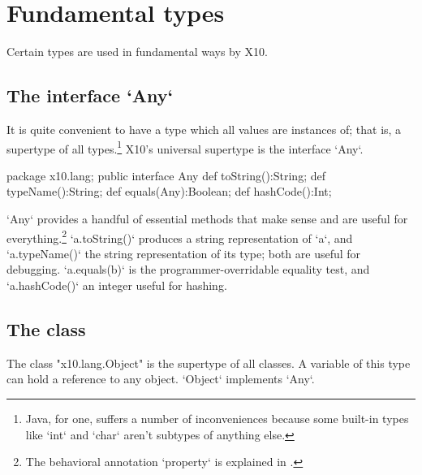 {\begin{itemize}
\end{itemize}


\section{Fundamental types}

Certain types are used in fundamental ways by X10.  

\subsection{The interface \xcd`Any`}

It is quite convenient to have a type which all values are instances of; that
is, a supertype of all types.\footnote{Java, for one, suffers a number of
  inconveniences because some built-in types like \xcd`int` and \xcd`char`
  aren't subtypes of anything else.}  X10's universal supertype is the
  interface \xcd`Any`. 

\begin{xten}
package x10.lang;
public interface Any {
  def toString():String;
  def typeName():String;
  def equals(Any):Boolean;
  def hashCode():Int;
}
\end{xten}

\xcd`Any` provides a handful of essential methods that make sense and are
useful for everything.\footnote{The behavioral annotation \xcd`property` is
  explained in .} \xcd`a.toString()` produces a
string representation of \xcd`a`, and \xcd`a.typeName()` the string
representation of its type; both are useful for debugging.  \xcd`a.equals(b)`
is the programmer-overridable equality test, and \xcd`a.hashCode()` an integer
useful for hashing.  


\subsection{The class }
\label{Object}

The class \xcd"x10.lang.Object" is the supertype of all classes.
A variable of this type can hold a reference to any object.
\xcd`Object` implements \xcd`Any`.



}
